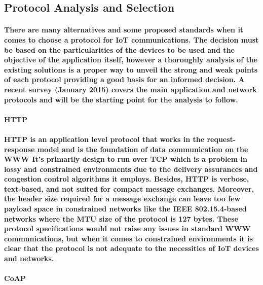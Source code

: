 \subsection{Protocol Analysis and Selection}

\paragraph{
	There are many alternatives and some proposed standards when it comes to choose a protocol for \ac{IoT} communications. The decision must be based on the particularities of the devices to be used and the objective of the application itself, however a thoroughly analysis of the existing solutions is a proper way to unveil the strong and weak points of each protocol providing a good basis for an informed decision. A recent survey (January 2015) \cite{Al-Fuqaha2015} covers the main application and network protocols and will be the starting point for the analysis to follow.
}

\paragraph{\textbf{\ac{HTTP}}}
\paragraph{
	\ac{HTTP} is an application level protocol that works in the request-response model and is the foundation of data communication on the \ac{WWW} It's primarily design to run over \ac{TCP} which is a problem in lossy and constrained environments due to the delivery assurances and congestion control algorithms it employs. Besides, {HTTP} is verbose, text-based, and not suited for compact message exchanges. Moreover, the header size required for a message exchange can leave too few payload space in constrained networks like the IEEE 802.15.4-based networks where the \ac{MTU} size of the protocol is 127 bytes. These protocol specifications would not raise any issues in standard \ac{WWW} communications, but when it comes to constrained environments it is clear that the protocol is not adequate to the necessities of \ac{IoT} devices and networks.
}

\paragraph{\textbf{\ac{CoAP}}}
